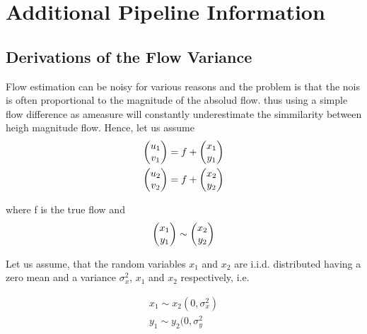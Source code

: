 \chapter{Additional Pipeline Information}
\section{Derivations of the Flow Variance}
\label{sec:derivation_flow_var}
Flow estimation can be noisy for various reasons and the problem is that the nois is often proportional to the magnitude of the absolud flow. thus using a simple flow difference as ameasure will constantly underestimate the simmilarity between heigh magnitude flow. Hence, let us assume 
\begin{equation}
\begin{aligned}
\colvec{u_1}{v_1} = f + \colvec{x_1}{y_1} \\
\colvec{u_2}{v_2} = f + \colvec{x_2}{y_2}
\end{aligned}
\label{eq:def_flow_tracking}	
\end{equation}

where f is the true flow and 
\begin{equation}
	\colvec{x_1}{y_1} \sim \colvec{x_2}{y_2}
\end{equation}

Let us assume, that the random variables $x_1$ and $x_2$ are i.i.d. distributed having a zero mean and a variance $\sigma_x^2$, $x_1$ and $x_2$ respectively, i.e.

\begin{equation}
\begin{aligned}
x_1 \sim x_2 (0, \sigma_x^2) \\
y_1 \sim y_2 (0, \sigma_y^2
\end{aligned}
\label{eq:def_flow_tracking}	
\end{equation}

